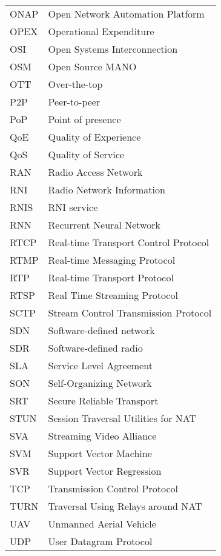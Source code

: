 \begin{longtable}{p{}p{}}
	ONAP & Open Network Automation Platform \\
	OPEX & Operational Expenditure \\
	OSI & Open Systems Interconnection \\
	OSM & Open Source MANO \\
	OTT & Over-the-top \\
	P2P & Peer-to-peer \\
	PoP & Point of presence \\
	QoE & Quality of Experience \\
	QoS & Quality of Service \\
	RAN & Radio Access Network \\
	RNI & Radio Network Information \\
	RNIS & RNI service \\
	RNN & Recurrent Neural Network \\
	RTCP & Real-time Transport Control Protocol \\
	RTMP & Real-time Messaging Protocol \\
	RTP & Real-time Transport Protocol \\
	RTSP & Real Time Streaming Protocol \\
	SCTP & Stream Control Transmission Protocol \\
	SDN & Software-defined network \\
	SDR & Software-defined radio \\
	SLA & Service Level Agreement \\
	SON & Self-Organizing Network \\
	SRT & Secure Reliable Transport \\
	STUN & Session Traversal Utilities for NAT \\
	SVA & Streaming Video Alliance \\
	SVM & Support Vector Machine \\
	SVR & Support Vector Regression \\
	TCP & Transmission Control Protocol \\
	TURN & Traversal Using Relays around NAT \\
	UAV & Unmanned Aerial Vehicle \\
	UDP & User Datagram Protocol \\

\end{longtable}

